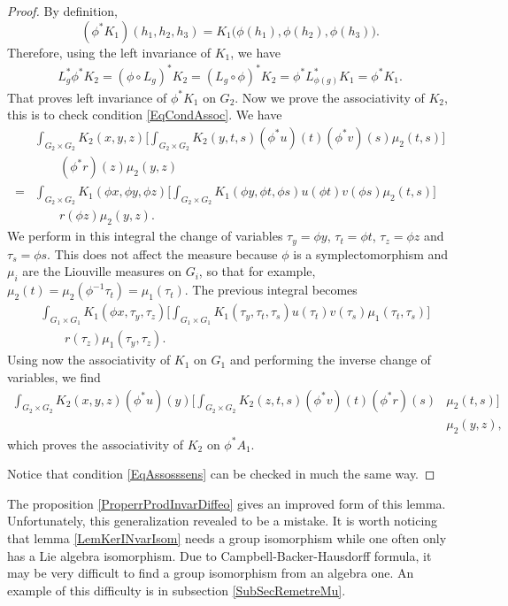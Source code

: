 \begin{proof}
By definition,
\[ 
(\phi^*K_1)(h_1,h_2,h_3)=K_1\big( \phi(h_1),\phi(h_2),\phi(h_3)\big).
\]
Therefore, using the left invariance of $K_1$, we have
\[ 
\begin{split}
	L_{g}^*\phi^*K_2=(\phi\circ L_{g})^*K_2=(L_{g}\circ\phi)^*K_2=\phi^*L_{\phi(g)}^*K_1=\phi^*K_1.
\end{split}  
\]
That proves left invariance of $\phi^*K_1$ on $G_{2}$.  Now we prove the associativity of $K_2$, this is to check condition  \eqref{EqCondAssoc}. We have
\[
\begin{split}
 &\int_{G_2\times G_2}K_2(x,y,z)\Bigg[ \int_{G_2\times G_2}K_2(y,t,s)(\phi^*u)(t)(\phi^*v)(s)\mu_2(t,s) \Bigg]\\
&\qquad(\phi^*r)(z)\mu_2(y,z)\\
=&\int_{G_2\times G_2}K_1(\phi x,\phi y,\phi z)\Bigg[  \int_{G_2\times G_2}K_1(\phi y,\phi t,\phi s)u(\phi t)v(\phi s)\mu_2(t,s)  \Bigg]\\
&\qquad r(\phi z)\mu_2(y,z).
\end{split}
\]
We perform in this integral the change of variables $\tau_y=\phi y$, $\tau_t=\phi t$, $\tau_z=\phi z$ and $\tau_s=\phi s$. This does not affect the measure because  $\phi$ is a symplectomorphism and $\mu_i$ are the Liouville measures on $G_i$, so that for example,  $\mu_2(t)=\mu_2(\phi^{-1}\tau_t)=\mu_1(\tau_t)$. The previous integral becomes
\[ 
\begin{split}
  &\int_{G_1\times G_1}K_1(\phi x,\tau_y,\tau_z)\Bigg[  \int_{G_1\times G_1}K_1(\tau_y,\tau_t,\tau_s)u(\tau_t)v(\tau_s)\mu_1(\tau_t,\tau_s)  \Bigg]\\
&\qquad r(\tau_z)\mu_1(\tau_y,\tau_z).
\end{split}
\]
Using now the associativity of $K_1$ on $G_1$ and performing the inverse change of variables, we find
\[ 
\begin{split}
\int_{G_2\times G_2}K_2(x,y,z)(\phi^*u)(y)\Bigg[ \int_{G_2\times G_2}K_2(z,t,s)(\phi^*v)(t)(\phi^*r)(s)&\mu_2(t,s)   \Bigg]\\
					&\mu_2(y,z),
\end{split}  
\]
which proves the associativity of $K_2$ on $\phi^*A_1$.

Notice that condition \eqref{EqAssosssens} can be checked in much the same way.

\end{proof}

The proposition \ref{ProperrProdInvarDiffeo} gives an improved form of this lemma. Unfortunately, this generalization revealed to be a mistake. It is worth noticing that lemma \ref{LemKerINvarIsom} needs a group isomorphism while one often only has a Lie algebra isomorphism. Due to Campbell-Backer-Hausdorff formula, it may be very difficult to find a group isomorphism from an algebra one. An example of this difficulty is in subsection  \ref{SubSecRemetreMu}.


